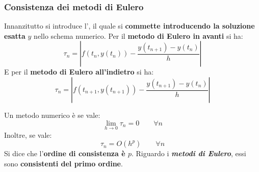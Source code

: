 \newpage

\subsubsection{Consistenza dei metodi di Eulero}

Innanzitutto si introduce l', il quale si \textbf{commette introducendo la soluzione esatta} $y$ nello schema numerico. Per il \textbf{metodo di Eulero in avanti} si ha:
\begin{equation}
	\tau_{n} = \left|f\left(t_{n}, y\left(t_{n}\right)\right) - \dfrac{y\left(t_{n+1}\right)-y\left(t_{n}\right)}{h}\right|
\end{equation}
E per il \textbf{metodo di Eulero all'indietro} si ha:
\begin{equation}
	\tau_{n} = \left|f\left(t_{n+1}, y\left(t_{n+1}\right)\right) - \dfrac{y\left(t_{n+1}\right)-y\left(t_{n}\right)}{h}\right|
\end{equation}

\highspace
Un metodo numerico è  se vale:
\begin{equation}
	\lim\limits_{h \rightarrow 0} \tau_{n} = 0 \hspace{2em} \forall n
\end{equation}
Inoltre, se vale:
\begin{equation}
	\tau_{n} = O\left(h^{p}\right) \hspace{2em} \forall n
\end{equation}
Si dice che l'\textbf{ordine di consistenza è $p$}. Riguardo i \textbf{\emph{metodi di Eulero}}, essi sono \textbf{consistenti del primo ordine}.

